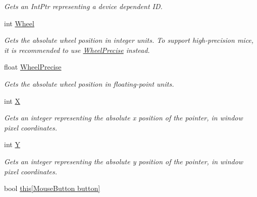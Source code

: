 \begin{DoxyCompactItemize}
\begin{DoxyCompactList}\small\item\em Gets an Int\-Ptr representing a device dependent I\-D. \end{DoxyCompactList}\item 
int \hyperlink{class_open_t_k_1_1_input_1_1_mouse_device_a903b16fe9f4b3b1054cfbc8051b3752b}{Wheel}
\begin{DoxyCompactList}\small\item\em Gets the absolute wheel position in integer units. To support high-\/precision mice, it is recommended to use \hyperlink{class_open_t_k_1_1_input_1_1_mouse_device_ace88f976bb7b736216cf785f3679dadd}{Wheel\-Precise} instead. \end{DoxyCompactList}\item 
float \hyperlink{class_open_t_k_1_1_input_1_1_mouse_device_ace88f976bb7b736216cf785f3679dadd}{Wheel\-Precise}
\begin{DoxyCompactList}\small\item\em Gets the absolute wheel position in floating-\/point units. \end{DoxyCompactList}\item 
int \hyperlink{class_open_t_k_1_1_input_1_1_mouse_device_afc266b67cf1809bb2d27d231ae5d2dd5}{X}
\begin{DoxyCompactList}\small\item\em Gets an integer representing the absolute x position of the pointer, in window pixel coordinates. \end{DoxyCompactList}\item 
int \hyperlink{class_open_t_k_1_1_input_1_1_mouse_device_aabbc4ab5371df1be49ad704927ff7e99}{Y}
\begin{DoxyCompactList}\small\item\em Gets an integer representing the absolute y position of the pointer, in window pixel coordinates. \end{DoxyCompactList}\item 
bool \hyperlink{class_open_t_k_1_1_input_1_1_mouse_device_a810e7103dac839c811324ef808365f8e}{this\mbox{[}\-Mouse\-Button button\mbox{]}}

\end{DoxyCompactItemize}
